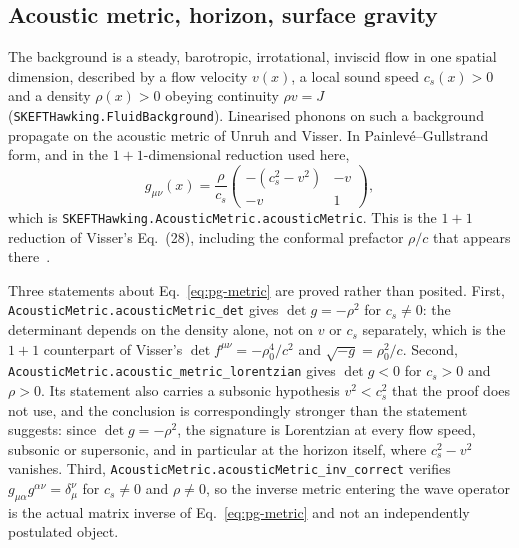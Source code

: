 \documentclass[aps,prd,reprint,nofootinbib,superscriptaddress]{revtex4-2}
\begin{document}
\subsection{Acoustic metric, horizon, surface gravity}
\label{sec:eft-metric}

The background is a steady, barotropic, irrotational, inviscid flow in
one spatial dimension, described by a flow velocity $v(x)$, a local sound
speed $c_s(x) > 0$ and a density $\rho(x) > 0$ obeying continuity
$\rho v = J$ (\texttt{SKEFTHawking.FluidBackground}). Linearised phonons
on such a background propagate on the acoustic metric of Unruh and
Visser. In Painlev\'e--Gullstrand form, and in the $1{+}1$-dimensional
reduction used here,
\begin{equation}
\label{eq:pg-metric}
g_{\mu\nu}(x) = \frac{\rho}{c_s}
\begin{pmatrix}
-(c_s^{2}-v^{2}) & -v \\[2pt]
-v & 1
\end{pmatrix},
\end{equation}
which is \texttt{SKEFTHawking.AcousticMetric.acousticMetric}. This is the
$1{+}1$ reduction of Visser's Eq.~(28), including the conformal prefactor
$\rho/c$ that appears there~\cite{Visser1998}.

Three statements about Eq.~\eqref{eq:pg-metric} are proved rather than
posited. First, \texttt{AcousticMetric.acousticMetric\_det} gives
$\det g = -\rho^{2}$ for $c_s \neq 0$: the determinant depends on the
density alone, not on $v$ or $c_s$ separately, which is the $1{+}1$
counterpart of Visser's $\det f^{\mu\nu} = -\rho_0^{4}/c^{2}$ and
$\sqrt{-g} = \rho_0^{2}/c$. Second,
\texttt{AcousticMetric.acoustic\_metric\_lorentzian} gives $\det g < 0$
for $c_s > 0$ and $\rho > 0$. Its statement also carries a subsonic
hypothesis $v^{2} < c_s^{2}$ that the proof does not use, and the
conclusion is correspondingly stronger than the statement suggests: since
$\det g = -\rho^{2}$, the signature is Lorentzian at every flow speed,
subsonic or supersonic, and in particular at the horizon itself, where
$c_s^{2}-v^{2}$ vanishes. Third,
\texttt{AcousticMetric.acousticMetric\_inv\_correct} verifies
$g_{\mu\alpha}g^{\alpha\nu} = \delta^{\nu}_{\mu}$ for $c_s \neq 0$ and
$\rho \neq 0$, so the inverse metric entering the wave operator is the
actual matrix inverse of Eq.~\eqref{eq:pg-metric} and not an
independently postulated object.
\end{document}
